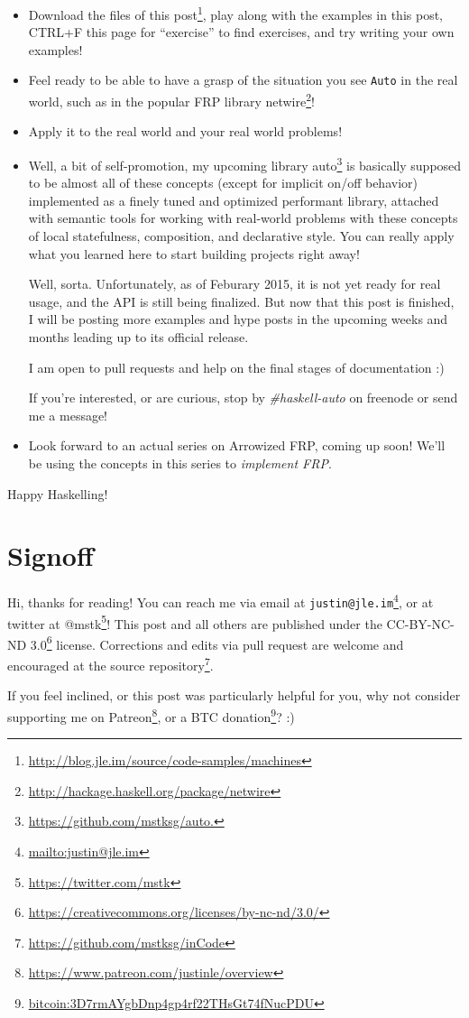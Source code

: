 \documentclass[]{article}
\renewcommand{\href}[2]{#2\footnote{\url{#1}}}
\begin{document}
\begin{itemize}
\item
  \href{http://blog.jle.im/source/code-samples/machines}{Download the files of
  this post}, play along with the examples in this post, CTRL+F this page for
  ``exercise'' to find exercises, and try writing your own examples!
\item
  Feel ready to be able to have a grasp of the situation you see \texttt{Auto}
  in the real world, such as in the popular FRP library
  \href{http://hackage.haskell.org/package/netwire}{netwire}!
\item
  Apply it to the real world and your real world problems!
\item
  Well, a bit of self-promotion, my upcoming library
  \href{https://github.com/mstksg/auto.}{auto} is basically supposed to be
  almost all of these concepts (except for implicit on/off behavior) implemented
  as a finely tuned and optimized performant library, attached with semantic
  tools for working with real-world problems with these concepts of local
  statefulness, composition, and declarative style. You can really apply what
  you learned here to start building projects right away!

  Well, sorta. Unfortunately, as of Feburary 2015, it is not yet ready for real
  usage, and the API is still being finalized. But now that this post is
  finished, I will be posting more examples and hype posts in the upcoming weeks
  and months leading up to its official release.

  I am open to pull requests and help on the final stages of documentation :)

  If you're interested, or are curious, stop by \emph{\#haskell-auto} on
  freenode or send me a message!
\item
  Look forward to an actual series on Arrowized FRP, coming up soon! We'll be
  using the concepts in this series to \emph{implement FRP}.
\end{itemize}

Happy Haskelling!

\section{Signoff}\label{signoff}

Hi, thanks for reading! You can reach me via email at
\href{mailto:justin@jle.im}{\nolinkurl{justin@jle.im}}, or at twitter at
\href{https://twitter.com/mstk}{@mstk}! This post and all others are published
under the \href{https://creativecommons.org/licenses/by-nc-nd/3.0/}{CC-BY-NC-ND
3.0} license. Corrections and edits via pull request are welcome and encouraged
at \href{https://github.com/mstksg/inCode}{the source repository}.

If you feel inclined, or this post was particularly helpful for you, why not
consider \href{https://www.patreon.com/justinle/overview}{supporting me on
Patreon}, or a \href{bitcoin:3D7rmAYgbDnp4gp4rf22THsGt74fNucPDU}{BTC donation}?
:)
\end{document}
